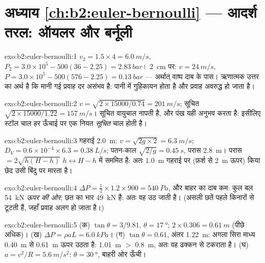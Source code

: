 \section*{अध्याय \ref{ch:b2:euler-bernoulli} --- आदर्श तरल: ऑयलर और बर्नूली}

\begin{solution}{exo:b2:euler-bernoulli:1}
$v_2 = 1.5 \times 4 = \qty{6.0}{m/s}$, $P_2 = 3.0 \times 10^5 - 500(36 - 2.25) =
\qty{2.83}{bar}$। \qty{2}{cm} पर: $v = \qty{24}{m/s}$, $P = 3.0 \times 10^5 - 500
(576 - 2.25) = \qty{0.13}{bar}$ --- अर्थात् वाष्प दाब के पास। ऋणात्मक
उत्तर का अर्थ है कि मानी गई प्रवाह दर असंभव है: पानी में गुहिकायन होता
है और प्रवाह अवरुद्ध हो जाता है।
\end{solution}

\begin{solution}{exo:b2:euler-bernoulli:2}
$v = \sqrt{2 \times 15000/0.74} = \qty{201}{m/s}$; सूचित $\sqrt{2 \times 15000/
1.22} = \qty{157}{m/s}$। सूचित वायुचाल  नापती है,
और पंख यही अनुभव करता है: इसीलिए स्टॉल चाल हर ऊँचाई पर एक नियत
\emph{सूचित} चाल होती है।
\end{solution}

\begin{solution}{exo:b2:euler-bernoulli:3}
गहराई \qty{2.0}{m}: $v = \sqrt{2g \times 2} = \qty{6.3}{m/s}$; $D_V = 0.6 \times 10^{-4}
\times 6.3 = \qty{0.38}{L/s}$; पतन-काल $\sqrt{2/g} = \qty{0.45}{s}$, परास
\qty{2.8}{m}। परास $= 2\sqrt{h(H - h)}$ $h \leftrightarrow H -
h$ में सममित है: अतः \qty{1.0}{m} गहराई पर (फ़र्श से \qty{2}{m} ऊपर) किया छेद उसी
बिंदु पर मारता है।
\end{solution}

\begin{solution}{exo:b2:euler-bernoulli:4}
$\Delta P = \tfrac12 \times 1.2 \times 900 = \qty{540}{Pa}$, और बाहर का दाब कम:
कुल बल \qty{54}{kN} \emph{ऊपर की ओर}; छत का भार \qty{49}{kN} है: अतः वह उठ
जाती है। (असली छतें पहले किनारों से टूटती हैं, जहाँ प्रवाह अलग हो जाता है।)
\end{solution}

\begin{solution}{exo:b2:euler-bernoulli:5}
(क) $\tan\theta = 3/9.81$, $\theta = \qty{17}{\degree}$; $2 \times 0.306 = \qty{0.61}{m}$
(पीछे अधिक)। (ख) $\Delta P = \rho aL = \qty{6.0}{kPa}$। (ग) $\tan\theta =
0.61$, अंतर \qty{1.22}{m}: अगला सिरा माध्य \qty{0.40}{m} से \qty{0.61}{m} ऊपर उठता
है: \qty{1.01}{m} $>$ \qty{0.8}{m}, अतः वह ढक्कन से टकराता है। (घ) $a = v^2/R =
\qty{5.6}{m/s^2}$: $\theta = \qty{30}{\degree}$, बाहरी ओर ऊँची।
\end{solution}

